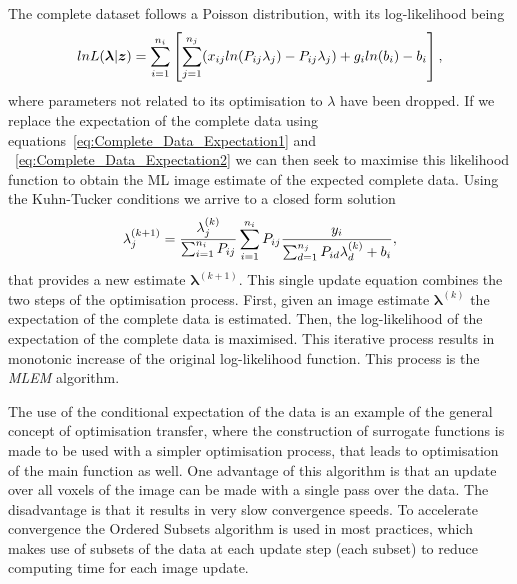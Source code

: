 The complete dataset follows a Poisson distribution, with its log-likelihood being
\begin{equation}
lnL(\bm{\lambda}|\bm{z}) = 
\sum_{i=1}^{n_i} \left[\sum_{j=1}^{n_j}( x_{ij} ln(P_{ij}\lambda_j) - P_{ij} \lambda_j) +
g_i ln(b_i) - b_i \right] \\ ,  
\label{eqn:log_likelihood_z}
\end{equation}
where parameters not related to its optimisation to $\lambda$ have been dropped. 
If we replace the expectation of the complete data using equations~\ref{eq:Complete_Data_Expectation1} and ~\ref{eq:Complete_Data_Expectation2} we can then seek to maximise this likelihood function to obtain the ML image estimate of the expected complete data. Using the Kuhn-Tucker conditions we arrive to a closed form solution
\begin{equation}
\lambda_j^{(k+1)} = \frac{\lambda_j^{(k)}}{\sum_{i=1}^{n_i} P_{ij}} 
\sum_{i=1}^{n_i} P_{ij} 
\frac{y_i}{\sum_{d=1}^{n_j} P_{id}\lambda_d^{(k)} + b_i } \\,
\label{eqn:MLEM}
\end{equation} 
that provides a new estimate $\bm{\lambda}^{(k+1)}$. This single update equation combines the two steps of the optimisation process. First, given an image estimate $\bm{\lambda}^{(k)}$ the expectation of the complete data is estimated. Then, the log-likelihood of the expectation of the complete data is maximised. This iterative process results in monotonic increase of the original log-likelihood function. This process is the \textit{MLEM} algorithm.

The use of the conditional expectation of the data is an example of the general concept of optimisation transfer, where the construction of surrogate functions is made to be used with a simpler optimisation process, that leads to optimisation of the main function as well. One advantage of this algorithm is that an update over all voxels of the image can be made with a single pass over the data. The disadvantage is that it results in very slow convergence speeds. 
To accelerate convergence the Ordered Subsets algorithm is used in most practices, which makes use of subsets of the data at each update step (each subset) to reduce computing time for each image update. 


